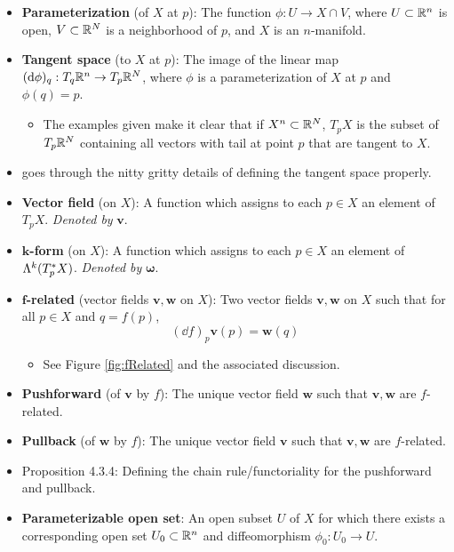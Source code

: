 \documentclass[../notes.tex]{subfiles}
\begin{document}
\begin{itemize}
    \item \textbf{Parameterization} (of $X$ at $p$): The function $\phi:U\to X\cap V$, where $U\subset\R^n$ is open, $V\subset\R^N$ is a neighborhood of $p$, and $X$ is an $n$-manifold.
    \item \textbf{Tangent space} (to $X$ at $p$): The image of the linear map $(\dd\phi)_q:T_q\R^n\to T_p\R^N$, where $\phi$ is a parameterization of $X$ at $p$ and $\phi(q)=p$.
    \begin{itemize}
        \item The examples given make it clear that if $X^n\subset\R^N$, $T_pX$ is the subset of $T_p\R^N$ containing all vectors with tail at point $p$ that are tangent to $X$.
    \end{itemize}
    \item \textcite{bib:DifferentialForms} goes through the nitty gritty details of defining the tangent space properly.
    \item \textbf{Vector field} (on $X$): A function which assigns to each $p\in X$ an element of $T_pX$. \emph{Denoted by} $\bm{\pmb{v}}$.
    \item \textbf{$\bm{k}$-form} (on $X$): A function which assigns to each $p\in X$ an element of $\lam[k]{T_p^*X}$. \emph{Denoted by} $\bm{\omega}$.
    \item \textbf{$\bm{f}$-related} (vector fields $\bm{v},\bm{w}$ on $X$): Two vector fields $\bm{v},\bm{w}$ on $X$ such that for all $p\in X$ and $q=f(p)$,
    \begin{equation*}
        (\dd f)_p\bm{v}(p) = \bm{w}(q)
    \end{equation*}
    \begin{itemize}
        \item See Figure \ref{fig:fRelated} and the associated discussion.
    \end{itemize}
    \item \textbf{Pushforward} (of $\bm{v}$ by $f$): The unique vector field $\bm{w}$ such that $\bm{v},\bm{w}$ are $f$-related.
    \item \textbf{Pullback} (of $\bm{w}$ by $f$): The unique vector field $\bm{v}$ such that $\bm{v},\bm{w}$ are $f$-related.
    \item Proposition 4.3.4: Defining the chain rule/functoriality for the pushforward and pullback.
    \item \textbf{Parameterizable open set}: An open subset $U$ of $X$ for which there exists a corresponding open set $U_0\subset\R^n$ and diffeomorphism $\phi_0:U_0\to U$.
    \begin{itemize}

\end{itemize}
\end{itemize}
\end{document}
